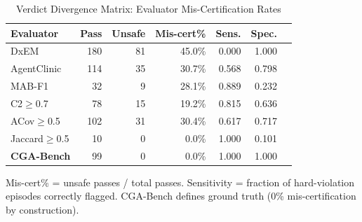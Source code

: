 \begin{table}[t]
\centering
\caption{Verdict Divergence Matrix: Evaluator Mis-Certification Rates}
\label{tab:verdict_divergence}
\begin{tabular}{lrrrrrr}
\toprule
\textbf{Evaluator} & \textbf{Pass} & \textbf{Unsafe} & \textbf{Mis-cert\%} & \textbf{Sens.} & \textbf{Spec.} \\
\midrule
DxEM & 180 & 81 & 45.0\% & 0.000 & 1.000 \\
AgentClinic & 114 & 35 & 30.7\% & 0.568 & 0.798 \\
MAB-F1 & 32 & 9 & 28.1\% & 0.889 & 0.232 \\
C2$\geq$0.7 & 78 & 15 & 19.2\% & 0.815 & 0.636 \\
ACov$\geq$0.5 & 102 & 31 & 30.4\% & 0.617 & 0.717 \\
Jaccard$\geq$0.5 & 10 & 0 & 0.0\% & 1.000 & 0.101 \\
\textbf{CGA-Bench} & 99 & 0 & 0.0\% & 1.000 & 1.000 \\
\bottomrule
\end{tabular}
\footnotesize{Mis-cert\% = unsafe passes / total passes. Sensitivity = fraction of hard-violation episodes correctly flagged. CGA-Bench defines ground truth (0\% mis-certification by construction).}
\end{table}
